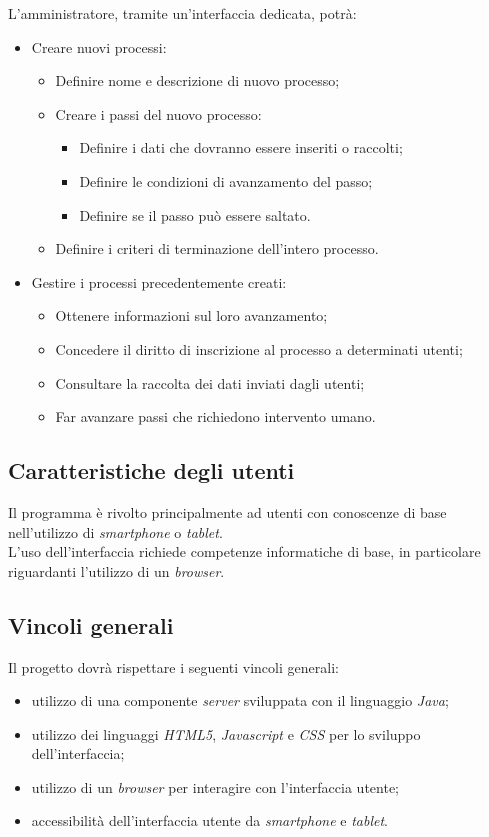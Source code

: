 L'amministratore, tramite un'interfaccia dedicata, potrà:

\begin{itemize}
\item Creare nuovi processi:
\begin{itemize}
\item Definire nome e descrizione di nuovo processo;
\item Creare i passi del nuovo processo:
\begin{itemize}
\item Definire i dati che dovranno essere inseriti o raccolti;
\item Definire le condizioni di avanzamento del passo;
\item Definire se il passo può essere saltato.
\end{itemize}
\item Definire i criteri di terminazione dell'intero processo.
\end{itemize}
\item Gestire i processi precedentemente creati:
\begin{itemize}
\item Ottenere informazioni sul loro avanzamento;
\item Concedere il diritto di inscrizione al processo a determinati utenti;
\item Consultare la raccolta dei dati inviati dagli utenti;
\item Far avanzare passi che richiedono intervento umano.
\end{itemize}
\end{itemize}

\subsection{Caratteristiche degli utenti}
Il programma è rivolto principalmente ad utenti con conoscenze di base nell'utilizzo di \textit{smartphone} o \textit{tablet}.\\
L'uso dell'interfaccia richiede competenze informatiche di base, in particolare riguardanti l'utilizzo di un \textit{browser}.

\subsection{Vincoli generali}
Il progetto dovrà rispettare i seguenti vincoli generali:
\begin{itemize}
\item utilizzo di una componente \textit{server} sviluppata con il linguaggio \textit{Java};
\item utilizzo dei linguaggi \textit{HTML5}, \textit{Javascript} e \textit{CSS} per lo sviluppo dell'interfaccia;
\item utilizzo di un \textit{browser} per interagire con l'interfaccia utente;
\item accessibilità dell'interfaccia utente da \textit{smartphone} e \textit{tablet}.
\end{itemize}